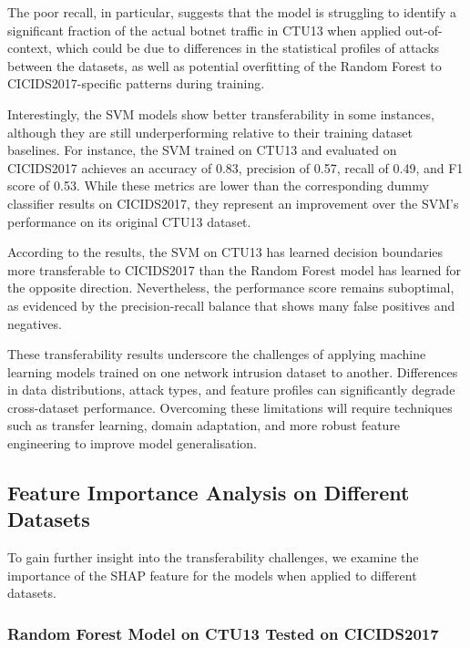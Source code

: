 The poor recall, in particular, suggests that the model is struggling to identify a significant fraction of the actual botnet traffic in CTU13 when applied out-of-context, which could be due to differences in the statistical profiles of attacks between the datasets, as well as potential overfitting of the Random Forest to CICIDS2017-specific patterns during training.

Interestingly, the SVM models show better transferability in some instances, although they are still underperforming relative to their training dataset baselines. For instance, the SVM trained on CTU13 and evaluated on CICIDS2017 achieves an accuracy of 0.83, precision of 0.57, recall of 0.49, and F1 score of 0.53. While these metrics are lower than the corresponding dummy classifier results on CICIDS2017, they represent an improvement over the SVM's performance on its original CTU13 dataset.

According to the results, the SVM on CTU13 has learned decision boundaries more transferable to CICIDS2017 than the Random Forest model has learned for the opposite direction. Nevertheless, the performance score remains suboptimal, as evidenced by the precision-recall balance that shows many false positives and negatives.

These transferability results underscore the challenges of applying machine learning models trained on one network intrusion dataset to another. Differences in data distributions, attack types, and feature profiles can significantly degrade cross-dataset performance. Overcoming these limitations will require techniques such as transfer learning, domain adaptation, and more robust feature engineering to improve model generalisation.

\subsection{Feature Importance Analysis on Different Datasets}\label{subsec:feature-importance-analysis-different-datasets}

To gain further insight into the transferability challenges, we examine the importance of the SHAP feature for the models when applied to different datasets.

\subsubsection{Random Forest Model on CTU13 Tested on CICIDS2017}\label{subsec:rf-ctu13-cicids2017}

